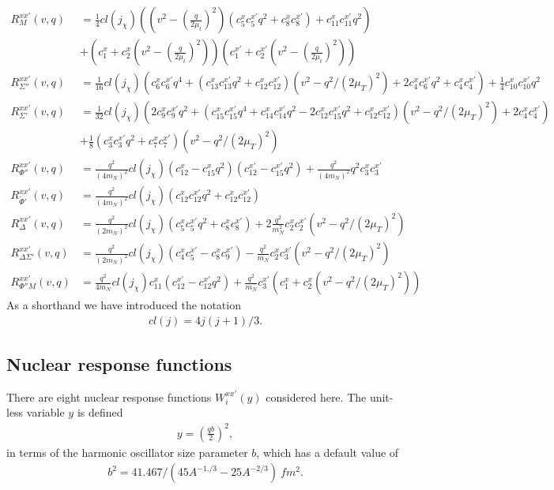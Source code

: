 \documentclass[12pt]{article}
\begin{document}
\begin{align}
R_{M}^{xx'}(v,q) &= 
\frac{1}{4}cl(j_\chi) \left(
	(v^2-(\frac{q}{2\mu_t})^2)(c_5^{x}c_5^{x'}q^2 + c_8^{x}c_8^{x'})
	+ c_{11}^{x}c_{11}^{x'}q^2
\right)\\
& + (c_1^{x} + c_2^{x}(v^2-(\frac{q}{2\mu_t})^2) )(c_1^{x'} + c_2^{x'}(v^2-(\frac{q}{2\mu_t})^2) )
\\
R_{\Sigma''}^{xx'}(v,q) &= 
\frac{1}{16}cl(j_\chi) \left(
	c_6^{x}c_6^{x'}q^4 + (c_{13}^{x}c_{13}^{x'}q^2 +c_{12}^{x} c_{12}^{x'} )
	(v^2-q^2/(2\mu_T)^2) + 2c_4^x c_6^{x'} q^2 + c_4^x c_4^{x '}
\right )
+ \frac{1}{4} c_{10}^x c_{10}^{x '} q^2
\\
R_{\Sigma'}^{xx'}(v,q) &= 
\frac{1}{32} cl(j_\chi) \left (
	2c_{9}^{x}c_{9}^{x'}q^2
	+ (
		c_{15}^{x}c_{15}^{x'}q^4
		+ c_{14}^{x}c_{14}^{x'}q^2
		-2 c_{12}^{x}c_{15}^{x'} q^2
		+c_{12}^{x}c_{12}^{x'}
	) (v^2-q^2/(2\mu_T)^2)
	+2 c_{4}^{x}c_{4}^{x'}
\right)\\
&+\frac{1}{8} \left(
	c_{3}^{x}c_3^{x'}q^2
	+ c_{7}^{x}c_{7}^{x'}
\right) (v^2-q^2/(2\mu_T)^2)
\\
R_{\Phi''}^{xx'}(v,q) &= 
\frac{q^2}{(4m_N)^2}cl(j_\chi) \left(
	c_{12}^x - c_{15}^{x} q^2
\right ) \left(
	c_{12}^{x '}-c_{15}^{x '}q^2
\right )
+ \frac{q^2}{(4m_N)^2}q^2c_3^x c_3^{x'}
\\
R_{\tilde{\Phi}'}^{xx'}(v,q) &= 
\frac{q^2}{(4m_N)^2}cl(j_\chi) \left(
	c_{12}^x c_{12}^{x'} q^2
	+ c_{12}^x c_{12}^{x'} 
\right)
\\
R_{\Delta}^{xx'}(v,q) &= 
\frac{q^2}{(2m_N)^2}cl(j_\chi) \left(
	c_{5}^{x}c_{5}^{x'}q^2
	+ c_{8}^{x}c_{8}^{x'}
\right)
+2\frac{q^2}{m_N^2} c_{2}^{x}c_{2}^{x'}
(v^2-q^2/(2\mu_T)^2)
\\
R_{\Delta \Sigma'}^{xx'}(v,q) &= 
\frac{q^2}{(2m_N)^2}cl(j_\chi) \left(
c_{4}^{x}c_{5}^{x'} - c_{8}^{x}c_{9}^{x'}
\right)
- \frac{q^2}{m_N}c_{2}^{x}c_{3}^{x'} (v^2-q^2/(2\mu_T)^2)
\\
R_{\Phi''M}^{xx'}(v,q) &= 
\frac{q^2}{4m_N} cl(j_\chi) c_{11}^{x} 
\left(
c_{12}^{x'} - c_{12}^{x'} q^2
\right)
+ \frac{q^2}{m_N} c_{3}^{x'} \left(
	c_{1}^{x} + c_{2}^{x} (v^2-q^2/(2\mu_T)^2)
\right)
\end{align}
As a shorthand we have introduced the notation 
\begin{align}
	cl(j) = 4j(j+1)/3.
\end{align}


\subsection{Nuclear response functions}
There are eight nuclear response functions $W_i^{xx'}(y)$ considered 
here. The unit-less variable $y$ is defined 
\begin{align}
 y = \left ( \frac{qb}{2} \right) ^2,
 \end{align}
 in terms of the harmonic oscillator size parameter $b$, which has a default value of 
 \begin{align}
b^2 = 41.467/(45A^{-1./3} - 25A^{-2/3})\ fm^2.
 \end{align}
\end{document}
